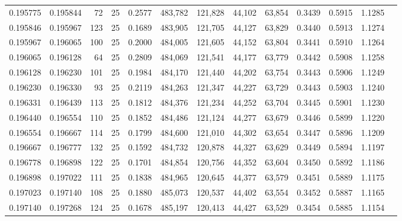\begin{tabular}{rrrrrrrrrrrrr}
0.195775 & 0.195844 &    72 &  25 &                                     0.2577 & 483,782 & 121,828 &  44,102 &  63,854 & 0.3439 & 0.5915 & 1.1285 \\
0.195846 & 0.195967 &   123 &  25 &                                     0.1689 & 483,905 & 121,705 &  44,127 &  63,829 & 0.3440 & 0.5913 & 1.1274 \\
0.195967 & 0.196065 &   100 &  25 &                                     0.2000 & 484,005 & 121,605 &  44,152 &  63,804 & 0.3441 & 0.5910 & 1.1264 \\
0.196065 & 0.196128 &    64 &  25 &                                     0.2809 & 484,069 & 121,541 &  44,177 &  63,779 & 0.3442 & 0.5908 & 1.1258 \\
0.196128 & 0.196230 &   101 &  25 &                                     0.1984 & 484,170 & 121,440 &  44,202 &  63,754 & 0.3443 & 0.5906 & 1.1249 \\
0.196230 & 0.196330 &    93 &  25 &                                     0.2119 & 484,263 & 121,347 &  44,227 &  63,729 & 0.3443 & 0.5903 & 1.1240 \\
0.196331 & 0.196439 &   113 &  25 &                                     0.1812 & 484,376 & 121,234 &  44,252 &  63,704 & 0.3445 & 0.5901 & 1.1230 \\
0.196440 & 0.196554 &   110 &  25 &                                     0.1852 & 484,486 & 121,124 &  44,277 &  63,679 & 0.3446 & 0.5899 & 1.1220 \\
0.196554 & 0.196667 &   114 &  25 &                                     0.1799 & 484,600 & 121,010 &  44,302 &  63,654 & 0.3447 & 0.5896 & 1.1209 \\
0.196667 & 0.196777 &   132 &  25 &                                     0.1592 & 484,732 & 120,878 &  44,327 &  63,629 & 0.3449 & 0.5894 & 1.1197 \\
0.196778 & 0.196898 &   122 &  25 &                                     0.1701 & 484,854 & 120,756 &  44,352 &  63,604 & 0.3450 & 0.5892 & 1.1186 \\
0.196898 & 0.197022 &   111 &  25 &                                     0.1838 & 484,965 & 120,645 &  44,377 &  63,579 & 0.3451 & 0.5889 & 1.1175 \\
0.197023 & 0.197140 &   108 &  25 &                                     0.1880 & 485,073 & 120,537 &  44,402 &  63,554 & 0.3452 & 0.5887 & 1.1165 \\
0.197140 & 0.197268 &   124 &  25 &                                     0.1678 & 485,197 & 120,413 &  44,427 &  63,529 & 0.3454 & 0.5885 & 1.1154 \\

\end{tabular}
